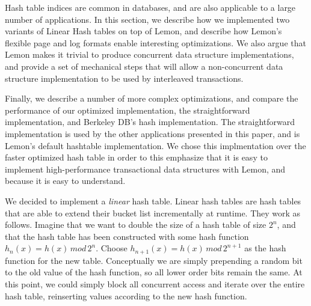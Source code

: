 \documentclass[letterpaper,twocolumn,english]{article}
\newcommand{\yad}{Lemon\xspace}
\begin{document}
%

Hash table indices are common in databases, and are also applicable to
a large number of applications.  In this section, we describe how we
implemented two variants of Linear Hash tables on top of \yad, and
describe how \yad's flexible page and log formats enable interesting
optimizations.  We also argue that \yad makes it trivial to produce
concurrent data structure implementations, and provide a set of
mechanical steps that will allow a non-concurrent data structure
implementation to be used by interleaved transactions.

Finally, we describe a number of more complex optimizations, and
compare the performance of our optimized implementation, the
straightforward implementation, and Berkeley DB's hash implementation.
The straightforward implementation is used by the other applications
presented in this paper, and is \yad's default hashtable
implementation.  We chose this implmentation over the faster optimized
hash table in order to this emphasize that it is easy to implement
high-performance transactional data structures with \yad, and because
it is easy to understand.

We decided to implement a {\em linear} hash table.  Linear hash tables are
hash tables that are able to extend their bucket list incrementally at
runtime. They work as follows. Imagine that we want to double the size
of a hash table of size $2^{n}$, and that the hash table has been
constructed with some hash function $h_{n}(x)=h(x)\, mod\,2^{n}$.
Choose $h_{n+1}(x)=h(x)\, mod\,2^{n+1}$ as the hash function for the
new table. Conceptually we are simply prepending a random bit to the
old value of the hash function, so all lower order bits remain the
same. At this point, we could simply block all concurrent access and
iterate over the entire hash table, reinserting values according to
the new hash function.
\end{document}
